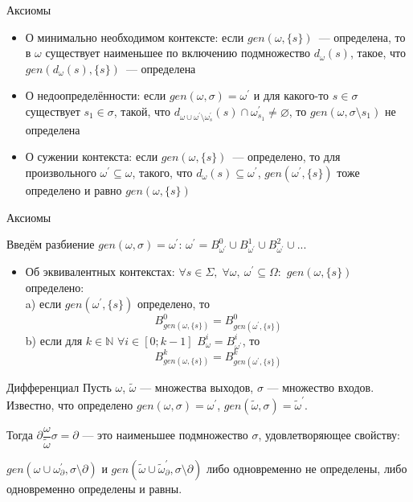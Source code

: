 \begin{frame}{Аксиомы}
\begin{itemize}
	\addtolength{\itemsep}{12pt}
	\item О минимально необходимом контексте: если $gen(\omega,\{s\})$~--- определена, то в $\omega$ существует наименьшее по включению подмножество $d_\omega(s)$, такое, что $gen(d_\omega(s), \{s\})$~--- определена
	
	\item О недоопределённости: если $gen(\omega, \sigma) = \omega^\prime$ и для какого-то $s\in\sigma$ существует $s_1\in\sigma$, такой, что $d_{\omega\cup\omega^\prime\setminus\omega^\prime_s}(s) \cap \omega^\prime_{s_1}\ne\varnothing$, то $gen(\omega, \sigma\setminus s_1)$ не определена
	
	\item О сужении контекста: если $gen(\omega,\{s\})$~--- определено, то для произвольного $\omega^\prime\subseteq\omega$, такого, что $d_\omega(s)\subseteq\omega^\prime$, $gen(\omega^\prime, \{s\})$ тоже определено и равно $gen(\omega,\{s\})$
\end{itemize}
\end{frame}

\begin{frame}{Аксиомы}

Введём разбиение $gen(\omega, \sigma) = \omega^\prime$: $\omega^\prime = B^0_{\omega^\prime} \cup B^1_{\omega^\prime} \cup B^2_{\omega^\prime} \cup ...$
	
\begin{itemize}
	\item Об эквивалентных контекстах: $\forall s \in \Sigma,\; \forall \omega,\: \omega^\prime \subseteq \Omega:$ $gen(\omega, \{s\})$ определено:\\
	a) если $gen(\omega^\prime, \{s\})$ определено, то $$B^0_{gen(\omega, \{s\})} = B^0_{gen(\omega^\prime, \{s\})}$$
	b) если для $k \in \mathbb{N}$ $\forall i \in [0; k-1]$ $B^i_{\omega} = B^i_{\omega^\prime}$, то $$B^k_{gen(\omega, \{s\})} = B^k_{gen(\omega^\prime, \{s\})}$$
\end{itemize}
\end{frame}

\begin{frame}{Дифференциал}
\setlength{\parskip}{12pt plus 1pt minus 1pt}
Пусть $\omega$, $\tilde{\omega}$ --- множества выходов, $\sigma$ --- множество входов. Известно, что определено $gen(\omega, \sigma) = \omega^\prime$, $gen(\tilde{\omega}, \sigma) = \tilde{\omega}^\prime$.

Тогда $\partial\dfrac{\omega}{\tilde{\omega}}\sigma = \partial$ --- это наименьшее подмножество $\sigma$, удовлетворяющее свойству: 

$gen(\omega \cup \omega^\prime_{\partial}, \sigma\setminus\partial)$ и
$gen(\tilde{\omega} \cup \tilde{\omega}^\prime_{\partial}, \sigma\setminus\partial)$ либо одновременно не определены, либо одновременно определены и равны. 
\end{frame}

